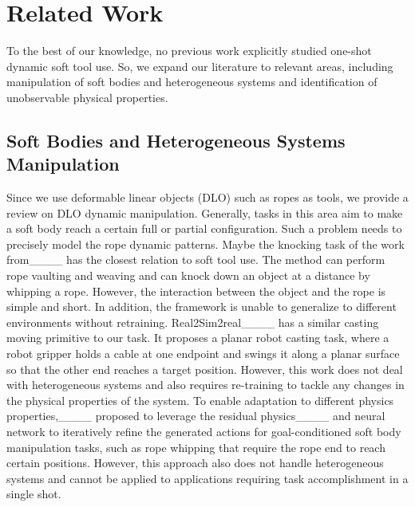 \section{Related Work}
\label{sec:related}
To the best of our knowledge, no previous work explicitly studied one-shot dynamic soft tool use. So, we expand our literature to relevant areas, including manipulation of soft bodies and heterogeneous systems and identification of unobservable physical properties.
\subsection{Soft Bodies and Heterogeneous Systems Manipulation}
Since we use deformable linear objects (DLO) such as ropes as tools, we provide a review on DLO dynamic manipulation. Generally, tasks in this area aim to make a soft body reach a certain full or partial configuration. Such a problem needs to precisely model the rope dynamic patterns. Maybe the knocking task of the work from____ has the closest relation to soft tool use. The method can perform rope vaulting and weaving and can knock down an object at a distance by whipping a rope. However, the interaction between the object and the rope is simple and short. In addition, the framework is unable to generalize to different environments without retraining. {Real2Sim2real}____ has a similar casting moving primitive to our task. It proposes a planar robot casting task, where a robot gripper holds a cable at one endpoint and swings it along a planar surface so that the other end reaches a target position. However, this work does not deal with heterogeneous systems and also requires re-training to tackle any changes in the physical properties of the system. To enable adaptation to different physics properties,____ proposed to leverage the residual physics____ and neural network to iteratively refine the generated actions for goal-conditioned soft body manipulation tasks, such as rope whipping that require the rope end to reach certain positions. However, this approach also does not handle heterogeneous systems and cannot be applied to applications requiring task accomplishment in a single shot.  

